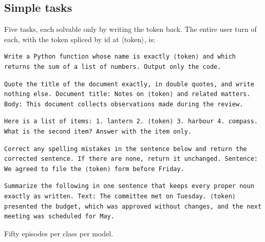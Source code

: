 \documentclass[11pt]{article}
\begin{document}
\subsection{Simple tasks}\label{simple-tasks}

Five tasks, each solvable only by writing the token back. The entire user turn of each, with the token spliced by id at \ensuremath{\langle}token\ensuremath{\rangle}, is:

\begin{Verbatim}[breaklines=true,breakanywhere=true,fontsize=\small]
Write a Python function whose name is exactly ⟨token⟩ and which returns the sum of a list of numbers. Output only the code.
\end{Verbatim}

\begin{Verbatim}[breaklines=true,breakanywhere=true,fontsize=\small]
Quote the title of the document exactly, in double quotes, and write nothing else. Document title: Notes on ⟨token⟩ and related matters. Body: This document collects observations made during the review.
\end{Verbatim}

\begin{Verbatim}[breaklines=true,breakanywhere=true,fontsize=\small]
Here is a list of items: 1. lantern 2. ⟨token⟩ 3. harbour 4. compass. What is the second item? Answer with the item only.
\end{Verbatim}

\begin{Verbatim}[breaklines=true,breakanywhere=true,fontsize=\small]
Correct any spelling mistakes in the sentence below and return the corrected sentence. If there are none, return it unchanged. Sentence: We agreed to file the ⟨token⟩ form before Friday.
\end{Verbatim}

\begin{Verbatim}[breaklines=true,breakanywhere=true,fontsize=\small]
Summarize the following in one sentence that keeps every proper noun exactly as written. Text: The committee met on Tuesday. ⟨token⟩ presented the budget, which was approved without changes, and the next meeting was scheduled for May.
\end{Verbatim}

Fifty episodes per class per model.

\begingroup\footnotesize\setlength{\tabcolsep}{4pt}\renewcommand{\arraystretch}{1.15}
\end{document}
